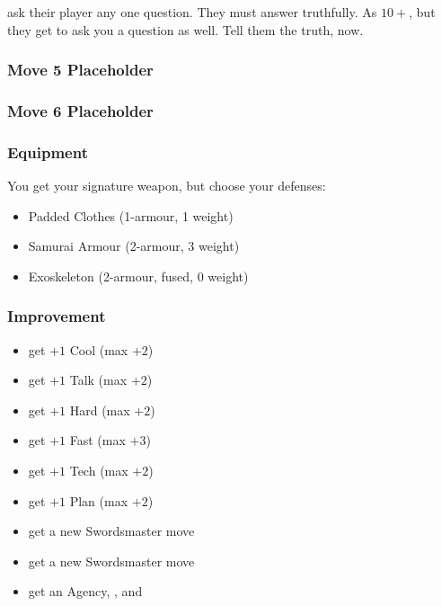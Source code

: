 {ask their player any one question. They must answer truthfully.}
{As $10+$, but they get to ask you a question as well. Tell them the truth, now.}

\subsubsection {Move 5 Placeholder} %

\subsubsection {Move 6 Placeholder} %

\subsubsection{Equipment}
You get your signature weapon, but choose your defenses:
\begin{itemize}
\item Padded Clothes (1-armour, 1 weight)
\item Samurai Armour (2-armour, 3 weight)
\item Exoskeleton (2-armour, fused, 0 weight)
\end{itemize}

\subsubsection{Improvement}
\begin{itemize}
\item get $+1$ Cool (max $+2$)
\item get $+1$ Talk (max $+2$)
\item get $+1$ Hard (max $+2$)
\item get $+1$ Fast (max $+3$)
\item get $+1$ Tech (max $+2$)
\item get $+1$ Plan (max $+2$)
\item get a new Swordsmaster move
\item get a new Swordsmaster move
\item get an Agency, , and 
\end{itemize}